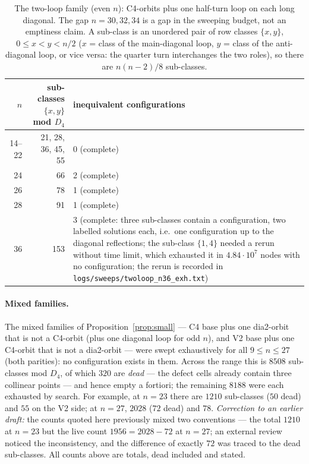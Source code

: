 \documentclass[11pt]{article}
\theoremstyle{remark}
\newcommand{\Dfour}{D_4}
\begin{document}
\begin{table}[ht]\centering\small
\begin{tabular}{r r p{9.5cm}}
\toprule
$n$ & sub-classes $\{x,y\}$ mod $\Dfour$ & inequivalent configurations\\
\midrule
14--22 & 21, 28, 36, 45, 55 & 0 (complete)\\
24 & 66 & 2 (complete)\\
26 & 78 & 1 (complete)\\
28 & 91 & 1 (complete)\\
36 & 153 & 3 (complete: three sub-classes contain a configuration, two labelled solutions each, i.e.\ one configuration
up to the diagonal reflections; the sub-class $\{1,4\}$ needed a rerun without time limit, which exhausted it in $4.84\cdot10^7$ nodes with no configuration; the rerun is recorded in \texttt{logs/sweeps/twoloop\_n36\_exh.txt})\\
\bottomrule
\end{tabular}
\caption{The two-loop family (even $n$): C4-orbits plus one half-turn loop on each long diagonal.  The gap $n=30,32,34$ is a gap in the sweeping budget, not an emptiness claim.  A sub-class is an
unordered pair of row classes $\{x,y\}$, $0\le x<y<n/2$ ($x$ = class of the main-diagonal loop, $y$ = class of the
anti-diagonal loop, or vice versa: the quarter turn interchanges the two roles), so there are $n(n-2)/8$ sub-classes.}
\label{tab:twoloop}
\end{table}

\paragraph{Mixed families.}  The mixed families of Proposition~\ref{prop:small} --- C4 base plus one dia2-orbit that is not a
C4-orbit (plus one diagonal loop for odd $n$), and V2 base plus one C4-orbit that is not a dia2-orbit --- were swept
exhaustively for all $9\le n\le27$ (both parities): no configuration exists in them.  Across the range this is $8508$
sub-classes mod $\Dfour$, of which $320$ are \emph{dead} --- the defect cells already contain three collinear points ---
and hence empty a fortiori; the remaining $8188$ were each exhausted by search.  For example, at $n=23$ there are $1210$
sub-classes ($50$ dead) and $55$ on the V2 side; at $n=27$, $2028$ ($72$ dead) and $78$.
\emph{Correction to an earlier draft:} the counts quoted here previously mixed two conventions --- the total $1210$ at
$n=23$ but the live count $1956=2028-72$ at $n=27$; an external review noticed the inconsistency, and the difference of
exactly $72$ was traced to the dead sub-classes.  All counts above are totals, dead included and stated.
\end{document}
